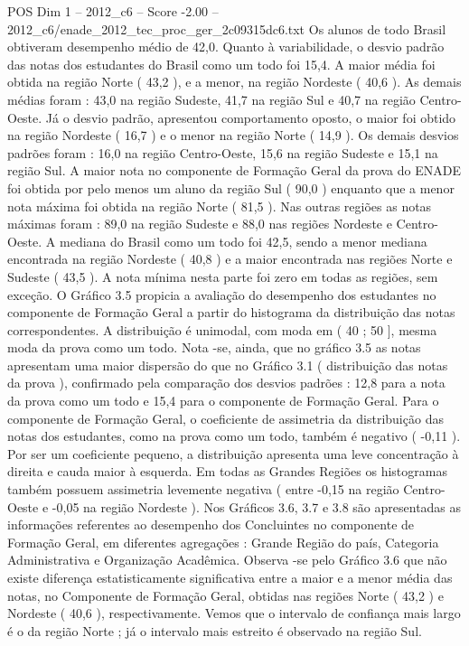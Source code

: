 \begin{textsample}{POS Dim 1 – 2012\_c6 – Score -2.00 – 2012\_c6/enade\_2012\_tec\_proc\_ger\_2c09315dc6.txt}
Os alunos de todo Brasil obtiveram desempenho médio de 42,0.
Quanto à variabilidade, o desvio padrão das notas dos estudantes do Brasil como um todo foi 15,4.
A maior média foi obtida na região Norte ( 43,2 ), e a menor, na região Nordeste ( 40,6 ).
As demais médias foram : 43,0 na região Sudeste, 41,7 na região Sul e 40,7 na região Centro-Oeste.
Já o desvio padrão, apresentou comportamento oposto, o maior foi obtido na região Nordeste ( 16,7 ) e o menor na região Norte ( 14,9 ).
Os demais desvios padrões foram : 16,0 na região Centro-Oeste, 15,6 na região Sudeste e 15,1 na região Sul.
A maior nota no componente de Formação Geral da prova do ENADE foi obtida por pelo menos um aluno da região Sul ( 90,0 ) enquanto que a menor nota máxima foi obtida na região Norte ( 81,5 ).
Nas outras regiões as notas máximas foram : 89,0 na região Sudeste e 88,0 nas regiões Nordeste e Centro-Oeste.
A mediana do Brasil como um todo foi 42,5, sendo a menor mediana encontrada na região Nordeste ( 40,8 ) e a maior encontrada nas regiões Norte e Sudeste ( 43,5 ).
A nota mínima nesta parte foi zero em todas as regiões, sem exceção.
O Gráfico 3.5 propicia a avaliação do desempenho dos estudantes no componente de Formação Geral a partir do histograma da distribuição das notas correspondentes.
A distribuição é unimodal, com moda em ( 40 ; 50 ], mesma moda da prova como um todo.
Nota -se, ainda, que no gráfico 3.5 as notas apresentam uma maior dispersão do que no Gráfico 3.1 ( distribuição das notas da prova ), confirmado pela comparação dos desvios padrões : 12,8 para a nota da prova como um todo e 15,4 para o componente de Formação Geral.
Para o componente de Formação Geral, o coeficiente de assimetria da distribuição das notas dos estudantes, como na prova como um todo, também é negativo ( -0,11 ).
Por ser um coeficiente pequeno, a distribuição apresenta uma leve concentração à direita e cauda maior à esquerda.
Em todas as Grandes Regiões os histogramas também possuem assimetria levemente negativa ( entre -0,15 na região Centro-Oeste e -0,05 na região Nordeste ).
Nos Gráficos 3.6, 3.7 e 3.8 são apresentadas as informações referentes ao desempenho dos Concluintes no componente de Formação Geral, em diferentes agregações : Grande Região do país, Categoria Administrativa e Organização Acadêmica.
Observa -se pelo Gráfico 3.6 que não existe diferença estatisticamente significativa entre a maior e a menor média das notas, no Componente de Formação Geral, obtidas nas regiões Norte ( 43,2 ) e Nordeste ( 40,6 ), respectivamente.
Vemos que o intervalo de confiança mais largo é o da região Norte ; já o intervalo mais estreito é observado na região Sul.

\end{textsample}
